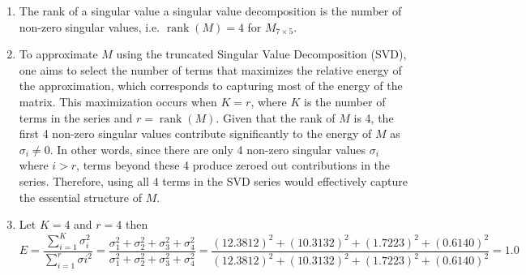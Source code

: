 \documentclass[letter,11pt]{article}
\theoremstyle{definition}
\begin{document}
\newpage

\begin{tcolorbox}[boxrule=1mm,enhanced jigsaw, breakable,before=\hfill,after=\hfill,adjusted title={Problem 6 solutions}]
    \begin{enumerate}[label = \alph*.)]
        \item The rank of a singular value a singular value decomposition is the number of non-zero singular values, i.e. $\operatorname{rank} \left(M\right) = 4$ for $M_{7\times 5}$.
        \item  To approximate \( M \) using the truncated Singular Value Decomposition (SVD), one aims to select the number of terms that maximizes the relative energy of the approximation, which corresponds to capturing most of the energy of the matrix. This maximization occurs when \( K = r \), where \( K \) is the number of terms in the series and \( r = \operatorname{rank}(M) \). Given that the rank of \( M \) is 4, the first 4 non-zero singular values contribute significantly to the energy of \( M \) as \( \sigma_{i} \neq 0 \). In other words, since there are only 4 non-zero singular values \( \sigma_{i} \) where \( i > r \), terms beyond these 4 produce zeroed out contributions in the series. Therefore, using all 4 terms in the SVD series would effectively capture the essential structure of \( M \).
        \item Let $K=4$ and $r=4$ then $$E = \frac{\sum_{i=1}^{K} \sigma_{i}^{2}}{\sum_{i=1}^{r} \sigma{i}^{2}} = \frac{\sigma_{1}^2 + \sigma_{2}^2 + \sigma_{3}^2+\sigma_{4}^2}{\sigma_{1}^2 + \sigma_{2}^2 + \sigma_{3}^2+\sigma_{4}^2} = \frac{(12.3812)^2 + (10.3132)^2+(1.7223)^2+(0.6140)^2}{(12.3812)^2 + (10.3132)^2+(1.7223)^2+(0.6140)^2} =  1.0$$
    \end{enumerate}
\end{tcolorbox}
\end{document}
